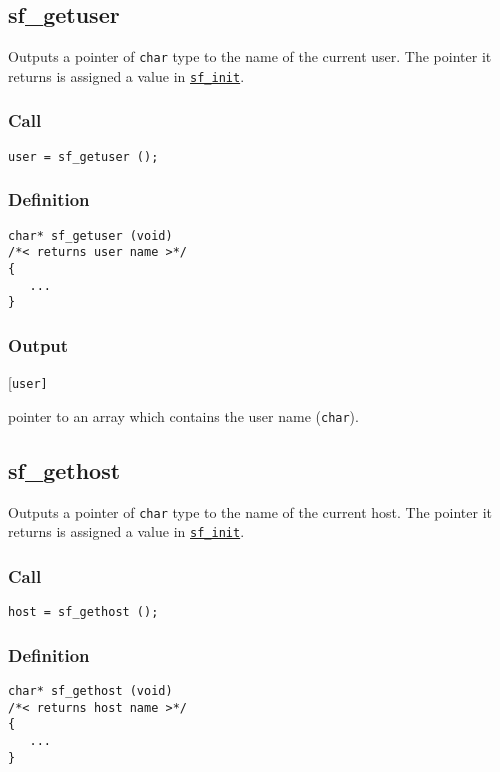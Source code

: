 \subsection{{sf\_getuser}}
Outputs a pointer of \texttt{char} type to the name of the current user. The pointer it returns is assigned a value in \hyperref[sec:sf_init]{\texttt{sf\_init}}.

\subsubsection*{Call}
\begin{verbatim}user = sf_getuser ();\end{verbatim}

\subsubsection*{Definition}
\begin{verbatim}
char* sf_getuser (void) 
/*< returns user name >*/
{
   ...
}
\end{verbatim}

\subsubsection*{Output}
\begin{desclist}{\tt }{\quad}[\tt user]
   \setlength\itemsep{0pt}
   \item[user] pointer to an array which contains the user name (\texttt{char}).
\end{desclist}




\subsection{{sf\_gethost}}
Outputs a pointer of \texttt{char} type to the name of the current host. The pointer it returns is assigned a value in \hyperref[sec:sf_init]{\texttt{sf\_init}}.

\subsubsection*{Call}
\begin{verbatim}host = sf_gethost ();\end{verbatim}

\subsubsection*{Definition}
\begin{verbatim}
char* sf_gethost (void) 
/*< returns host name >*/
{
   ...
}
\end{verbatim}


